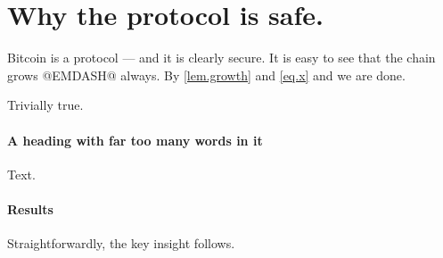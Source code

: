 \documentclass{llncs}
\begin{document}
\section{Why the protocol is safe.}\label{safety}
Bitcoin is a protocol --- and it is
clearly secure. It is easy
to see that the chain grows @EMDASH@ always.
By \ref{lem.growth} and \eqref{eq.x} and  we are done.
\begin{lemma}\label{lem.growth}
Trivially true.  
\end{lemma}
\paragraph{A heading with far too many words in it} Text.
\paragraph{Results} Straightforwardly, the key insight follows.
\end{document}
